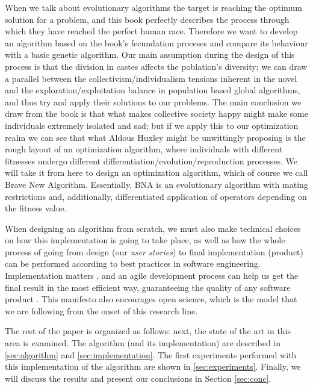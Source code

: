 When we talk about evolutionary algorithms the target is reaching the optimum
solution for a problem, and this book perfectly describes the process through
which they have reached the perfect human race. Therefore we want to develop an
algorithm based on the book's fecundation proceses and compare its behaviour
with a basic genetic algorithm. Our main assumption during the design of this process is
that the division in castes affects the poblation's diversity; we can draw a
parallel between the collectivism/individualism tensions inherent in the novel
and the exploration/exploitation balance in population based global algorithms,
and thus try and apply their solutions to our problems. The main conclusion we
draw from the book is that what makes collective society happy might make some
individuals extremely isolated and sad; but if we apply this to our optimization
realm we can see that what Aldous Huxley might be unwittingly proposing is the
rough layout of an optimization algorithm, where individuals with different
fitnesses undergo different differentiation/evolution/reproduction processes. We
will take it from here to design an optimization algorithm, which of course we
call {\sf Brave New Algorithm}. Essentially, {\sf BNA} is an evolutionary
algorithm with mating restrictions and, additionally, differentiated application
of operators depending on the fitness value.

When designing an algorithm from scratch, we must also make technical
choices on how this implementation is going to take place, as well as
how the whole process of going from design (our {\em user stories}) to
final implementation (product) can be performed according to best
practices in software engineering. Implementation matters
\cite{merelo2011implementation}, and an agile development process can
help us get the final result in the most efficient way, guaranteeing
the quality of any software product \cite{agile_manifesto}. This manifesto also
encourages open science, which is the model that we are following from the onset
of this research line.

The rest of the paper is organized as follows: next, the state of the art in
this area is examined. The algorithm (and its implementation) are described in
\ref{sec:algorithm} and \ref{sec:implementation}. The first experiments
performed with this implementation of the algorithm are shown in
\ref{sec:experiments}. Finally, we will discuss the results and present our
conclusions in Section \ref{sec:conc}.